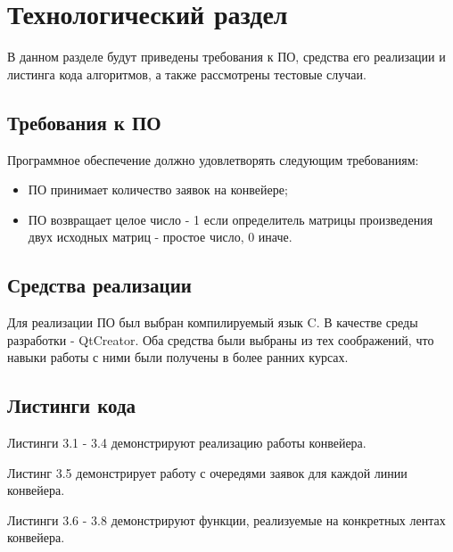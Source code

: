 \chapter{Технологический раздел}

В данном разделе будут приведены требования к ПО, средства его реализации и листинга кода алгоритмов, а также рассмотрены тестовые случаи.

\section{Требования к ПО}

Программное обеспечение должно удовлетворять следующим требованиям:
\begin{itemize}
	\item ПО принимает количество заявок на конвейере;
	\item ПО возвращает целое число - 1 если определитель матрицы произведения двух исходных матриц - простое число, 0 иначе.
\end{itemize}

\section{Средства реализации} 

Для реализации ПО был выбран компилируемый язык C. В качестве среды разработки - QtCreator. Оба средства были выбраны из тех соображений, что навыки работы с ними были получены в более ранних курсах.

\section{Листинги кода}

Листинги 3.1 - 3.4 демонстрируют реализацию работы конвейера.

Листинг 3.5 демонстрирует работу с очередями заявок для каждой линии конвейера.

Листинги 3.6 - 3.8 демонстрируют функции, реализуемые на конкретных лентах конвейера.

